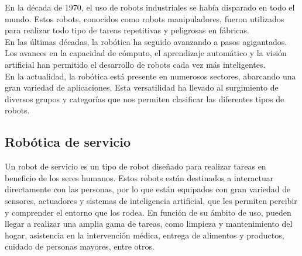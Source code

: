 En la década de 1970, el uso de robots industriales se había disparado en todo el mundo. Estos robots, conocidos como robots manipuladores, fueron utilizados para 
realizar todo tipo de tareas repetitivas y peligrosas en fábricas.
\\
En las últimas décadas, la robótica ha seguido avanzando a pasos agigantados. Los avances en la capacidad de cómputo, el aprendizaje automático y la visión 
artificial han permitido el desarrollo de robots cada vez más inteligentes.
\\
En la actualidad, la robótica está presente en numerosos sectores, abarcando una gran variedad de aplicaciones. Esta versatilidad ha llevado al surgimiento 
de diversos grupos y categorías que nos permiten clasificar las diferentes tipos de robots. 
\newpage

\subsection{Robótica de servicio}
Un robot de servicio es un tipo de robot diseñado para realizar tareas en beneficio de los seres humanos. Estos robots están 
destinados a interactuar directamente con las personas, por lo que están equipados con gran variedad de sensores, actuadores y sistemas de 
inteligencia artificial, que les permiten percibir y comprender el entorno que los rodea. 
En función de su ámbito de uso, pueden llegar a realizar una amplia gama de tareas, como limpieza y mantenimiento del hogar, 
asistencia en la intervención médica, entrega de alimentos y productos, cuidado de personas mayores, entre otros.

